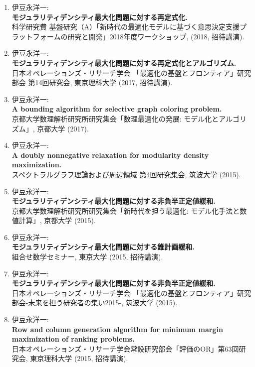 \documentclass[a4j,uplatex,9pt]{jsarticle}
\begin{document}
\begin{enumerate}

\item 伊豆永洋一:\\
{\bf モジュラリティデンシティ最大化問題に対する再定式化.}\\
{科学研究費 基盤研究（A）「新時代の最適化モデルに基づく意思決定支援プラットフォームの研究と開発」2018年度ワークショップ}, (2018, 招待講演).

\item 伊豆永洋一:\\
{\bf モジュラリティデンシティ最大化問題に対する再定式化とアルゴリズム.}\\
{日本オペレーションズ・リサーチ学会 「最適化の基盤とフロンティア」研究部会 第14回研究会}, 東京理科大学 (2017, 招待講演).

\item 伊豆永洋一:\\
{\bf A bounding algorithm for selective graph coloring problem.}\\
{京都大学数理解析研究所研究集会「数理最適化の発展: モデル化とアルゴリズム」}, 京都大学 (2017).

\item 伊豆永洋一:\\
{\bf A doubly nonnegative relaxation for modularity density maximization.}\\
{スペクトラルグラフ理論および周辺領域 第4回研究集会}, 筑波大学 (2015).

\item 伊豆永洋一:\\
{\bf モジュラリティデンシティ最大化問題に対する非負半正定値緩和.}\\
{京都大学数理解析研究所研究集会「新時代を担う最適化: モデル化手法と数値計算」}, 京都大学 (2015).

\item 伊豆永洋一:\\
{\bf モジュラリティデンシティ最大化問題に対する錐計画緩和.}\\
{組合せ数学セミナー}, 東京大学 (2015, 招待講演).

\item 伊豆永洋一:\\
{\bf モジュラリティデンシティ最大化問題に対する非負半正定値緩和.}\\
{日本オペレーションズ・リサーチ学会 「最適化の基盤とフロンティア」研究部会-未来を担う研究者の集い2015-}, 筑波大学 (2015).

\item 伊豆永洋一:\\
{\bf Row and column generation algorithm for minimum margin maximization of ranking problems.}\\
{日本オペレーションズ・リサーチ学会常設研究部会「評価のOR」第63回研究会}, 東京理科大学 (2015, 招待講演).


\end{enumerate}
\end{document}
